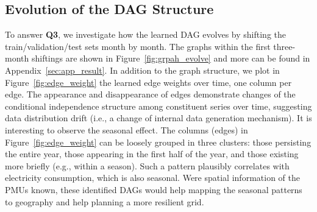 \subsection{Evolution of the DAG Structure}
To answer \textbf{Q3}, we investigate how the learned DAG evolves by shifting the train/validation/test sets month by month. The graphs within the first three-month shiftings are shown in Figure~\ref{fig:grpah_evolve} and more can be found in Appendix~\ref{sec:app_result}. In addition to the graph structure, we plot in Figure~\ref{fig:edge_weight} the learned edge weights over time, one column per edge. The appearance and disappearance of edges demonstrate changes of the conditional independence structure among constituent series over time, suggesting data distribution drift (i.e., a change of internal data generation mechanism). It is interesting to observe the seasonal effect. The columns (edges) in Figure~\ref{fig:edge_weight} can be loosely grouped in three clusters: those persisting the entire year, those appearing in the first half of the year, and those existing more briefly (e.g., within a season). Such a pattern plausibly correlates with electricity consumption, which is also seasonal. Were spatial information of the PMUs known, these identified DAGs would help mapping the seasonal patterns to geography and help planning a more resilient grid.
